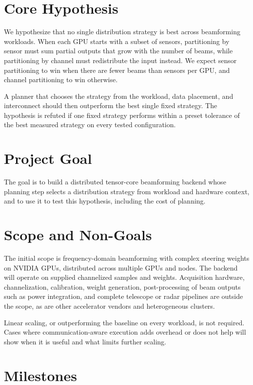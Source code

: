 \documentclass[10pt,letterpaper]{article}
\begin{document}
\section{Core Hypothesis}

We hypothesize that no single distribution strategy is best across beamforming workloads. When each GPU starts with a subset of sensors, partitioning by sensor must sum partial outputs that grow with the number of beams, while partitioning by channel must redistribute the input instead. We expect sensor partitioning to win when there are fewer beams than sensors per GPU, and channel partitioning to win otherwise.

A planner that chooses the strategy from the workload, data placement, and interconnect should then outperform the best single fixed strategy. The hypothesis is refuted if one fixed strategy performs within a preset tolerance of the best measured strategy on every tested configuration.

\section{Project Goal}

The goal is to build a distributed tensor-core beamforming backend whose planning step selects a distribution strategy from workload and hardware context, and to use it to test this hypothesis, including the cost of planning.

\section{Scope and Non-Goals}

The initial scope is frequency-domain beamforming with complex steering weights on NVIDIA GPUs, distributed across multiple GPUs and nodes. The backend will operate on supplied channelized samples and weights. Acquisition hardware, channelization, calibration, weight generation, post-processing of beam outputs such as power integration, and complete telescope or radar pipelines are outside the scope, as are other accelerator vendors and heterogeneous clusters.

Linear scaling, or outperforming the baseline on every workload, is not required. Cases where communication-aware execution adds overhead or does not help will show when it is useful and what limits further scaling.

\section{Milestones}
\end{document}
